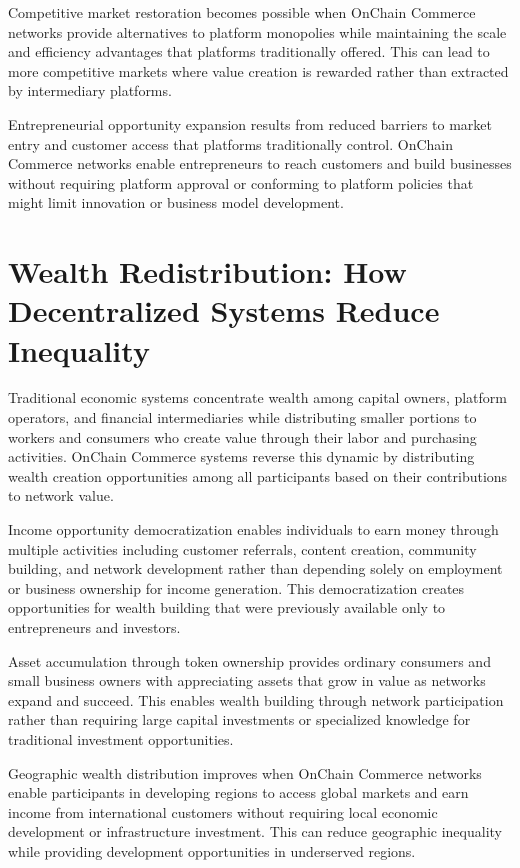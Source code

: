 \documentclass[
  Letterpaper,
]{scrbook}
\begin{document}
Competitive market restoration becomes possible when OnChain Commerce
networks provide alternatives to platform monopolies while maintaining
the scale and efficiency advantages that platforms traditionally
offered. This can lead to more competitive markets where value creation
is rewarded rather than extracted by intermediary platforms.

Entrepreneurial opportunity expansion results from reduced barriers to
market entry and customer access that platforms traditionally control.
OnChain Commerce networks enable entrepreneurs to reach customers and
build businesses without requiring platform approval or conforming to
platform policies that might limit innovation or business model
development.

\section{Wealth Redistribution: How Decentralized Systems Reduce
Inequality}\label{wealth-redistribution-how-decentralized-systems-reduce-inequality}

Traditional economic systems concentrate wealth among capital owners,
platform operators, and financial intermediaries while distributing
smaller portions to workers and consumers who create value through their
labor and purchasing activities. OnChain Commerce systems reverse this
dynamic by distributing wealth creation opportunities among all
participants based on their contributions to network value.

Income opportunity democratization enables individuals to earn money
through multiple activities including customer referrals, content
creation, community building, and network development rather than
depending solely on employment or business ownership for income
generation. This democratization creates opportunities for wealth
building that were previously available only to entrepreneurs and
investors.

Asset accumulation through token ownership provides ordinary consumers
and small business owners with appreciating assets that grow in value as
networks expand and succeed. This enables wealth building through
network participation rather than requiring large capital investments or
specialized knowledge for traditional investment opportunities.

Geographic wealth distribution improves when OnChain Commerce networks
enable participants in developing regions to access global markets and
earn income from international customers without requiring local
economic development or infrastructure investment. This can reduce
geographic inequality while providing development opportunities in
underserved regions.
\end{document}
